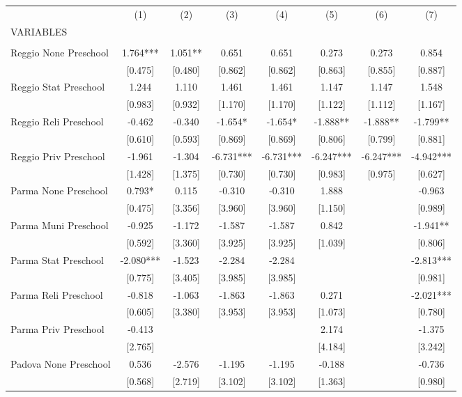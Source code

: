 \begin{tabular}{lccccccc} \hline
 & (1) & (2) & (3) & (4) & (5) & (6) & (7) \\
VARIABLES &  &  &  &  &  &  &  \\ \hline
 &  &  &  &  &  &  &  \\
Reggio None Preschool & 1.764*** & 1.051** & 0.651 & 0.651 & 0.273 & 0.273 & 0.854 \\
 & [0.475] & [0.480] & [0.862] & [0.862] & [0.863] & [0.855] & [0.887] \\
Reggio Stat Preschool & 1.244 & 1.110 & 1.461 & 1.461 & 1.147 & 1.147 & 1.548 \\
 & [0.983] & [0.932] & [1.170] & [1.170] & [1.122] & [1.112] & [1.167] \\
Reggio Reli Preschool & -0.462 & -0.340 & -1.654* & -1.654* & -1.888** & -1.888** & -1.799** \\
 & [0.610] & [0.593] & [0.869] & [0.869] & [0.806] & [0.799] & [0.881] \\
Reggio Priv Preschool & -1.961 & -1.304 & -6.731*** & -6.731*** & -6.247*** & -6.247*** & -4.942*** \\
 & [1.428] & [1.375] & [0.730] & [0.730] & [0.983] & [0.975] & [0.627] \\
Parma None Preschool & 0.793* & 0.115 & -0.310 & -0.310 & 1.888 &  & -0.963 \\
 & [0.475] & [3.356] & [3.960] & [3.960] & [1.150] &  & [0.989] \\
Parma Muni Preschool & -0.925 & -1.172 & -1.587 & -1.587 & 0.842 &  & -1.941** \\
 & [0.592] & [3.360] & [3.925] & [3.925] & [1.039] &  & [0.806] \\
Parma Stat Preschool & -2.080*** & -1.523 & -2.284 & -2.284 &  &  & -2.813*** \\
 & [0.775] & [3.405] & [3.985] & [3.985] &  &  & [0.981] \\
Parma Reli Preschool & -0.818 & -1.063 & -1.863 & -1.863 & 0.271 &  & -2.021*** \\
 & [0.605] & [3.380] & [3.953] & [3.953] & [1.073] &  & [0.780] \\
Parma Priv Preschool & -0.413 &  &  &  & 2.174 &  & -1.375 \\
 & [2.765] &  &  &  & [4.184] &  & [3.242] \\
Padova None Preschool & 0.536 & -2.576 & -1.195 & -1.195 & -0.188 &  & -0.736 \\
 & [0.568] & [2.719] & [3.102] & [3.102] & [1.363] &  & [0.980] \\

\end{tabular}
